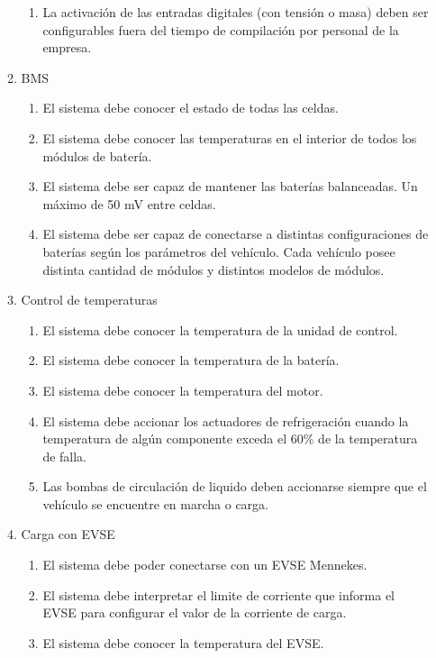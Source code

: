 \documentclass[
11pt, %
codirector, %
]{charter}
\begin{document}
\begin{enumerate}
\begin{enumerate}
\begin{enumerate}
			            \item La activación de las entradas digitales (con tensión o masa) deben ser configurables fuera del tiempo de compilación por personal de la empresa.
		            \end{enumerate}
		      \item BMS
		            \begin{enumerate}
			            \item El sistema debe conocer el estado de todas las celdas.
			            \item El sistema debe conocer las temperaturas en el interior de todos los módulos de batería.
			            \item El sistema debe ser capaz de mantener las baterías balanceadas. Un máximo de 50 mV entre celdas.
			            \item El sistema debe ser capaz de conectarse a distintas configuraciones de baterías según los parámetros del vehículo. Cada vehículo posee distinta cantidad de módulos y distintos modelos de módulos.
		            \end{enumerate}
		      \item Control de temperaturas
		            \begin{enumerate}
			            \item El sistema debe conocer la temperatura de la unidad de control.
			            \item El sistema debe conocer la temperatura de la batería.
			            \item El sistema debe conocer la temperatura del motor.
			            \item El sistema debe accionar los actuadores de refrigeración cuando la temperatura de algún componente exceda el 60\% de la temperatura de falla.
			            \item Las bombas de circulación de liquido deben accionarse siempre que el vehículo se encuentre en marcha o carga.
		            \end{enumerate}
		      \item Carga con EVSE
		            \begin{enumerate}
			            \item El sistema debe poder conectarse con un EVSE Mennekes.
			            \item El sistema debe interpretar el limite de corriente que informa el EVSE para configurar el valor de la corriente de carga.
			            \item El sistema debe conocer la temperatura del EVSE.

\end{enumerate}
\end{enumerate}
\end{enumerate}
\end{document}
